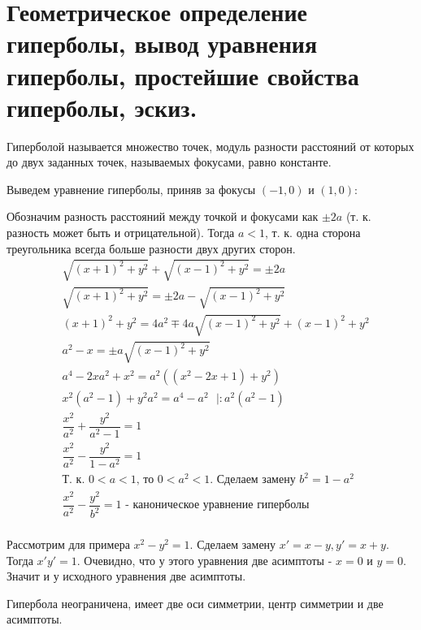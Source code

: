 \documentclass[12pt]{article}
\begin{document}
\begin{sloppypar}
    \section{Геометрическое определение гиперболы, вывод уравнения гиперболы, простейшие свойства гиперболы, эскиз.}
    Гиперболой называется множество точек, модуль разности расстояний от которых до двух заданных точек, называемых фокусами, равно константе.

    Выведем уравнение гиперболы, приняв за фокусы $(-1, 0)$ и $(1, 0)$:

    Обозначим разность расстояний между точкой и фокусами как $\pm 2a$ (т. к. разность может быть и отрицательной). Тогда $a < 1$, т. к. одна сторона треугольника всегда больше разности двух других сторон.
    \begin{align*}
         & \sqrt{(x + 1)^2 + y^2} + \sqrt{(x - 1)^2 + y^2} = \pm 2a                           \\
         & \sqrt{(x + 1)^2 + y^2} = \pm 2a - \sqrt{(x - 1)^2 + y^2}                           \\
         & (x + 1)^2 + y^2 = 4a^2 \mp 4a\sqrt{(x - 1)^2 + y^2} + (x - 1)^2 + y^2              \\
         & a^2 - x = \pm a\sqrt{(x - 1)^2 + y^2}                                              \\
         & a^4 - 2xa^2 + x^2 = a^2((x^2 - 2x + 1) + y^2)                                      \\
         & x^2(a^2 - 1) + y^2a^2 = a^4 - a^2 \ \ \ | : a^2(a^2 - 1)                           \\
         & \dfrac{x^2}{a^2} + \dfrac{y^2}{a^2 - 1} = 1                                        \\
         & \dfrac{x^2}{a^2} - \dfrac{y^2}{1 - a^2} = 1                                        \\
         & \text{Т. к. $0 < a < 1$, то $0 < a^2 < 1$. Сделаем замену $b^2 = 1 - a^2$}         \\
         & \dfrac{x^2}{a^2} - \dfrac{y^2}{b^2} = 1 \text{ - каноническое уравнение гиперболы} \\
    \end{align*}

    Рассмотрим для примера $x^2 - y^2 = 1$. Сделаем замену $x' = x - y, y' = x + y$. Тогда $x'y' = 1$. Очевидно, что у этого уравнения две асимптоты - $x = 0$ и $y = 0$. Значит и у исходного уравнения две асимптоты.

    Гипербола неограничена, имеет две оси симметрии, центр симметрии и две асимптоты.


\end{sloppypar}
\end{document}
